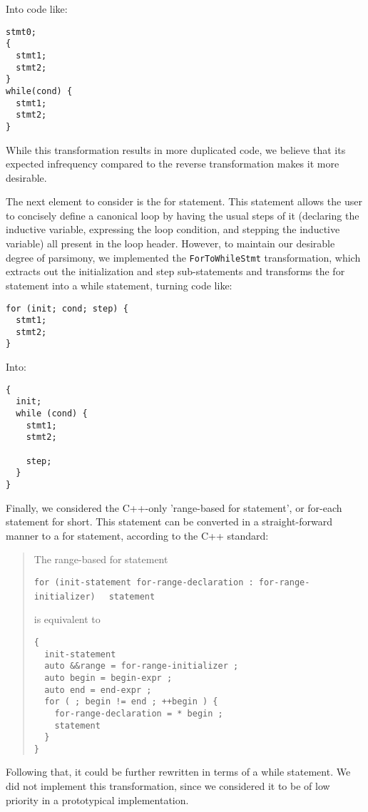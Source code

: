 Into code like:

\begin{lstlisting}
stmt0;
{
  stmt1;
  stmt2;
}
while(cond) {
  stmt1;
  stmt2;
}
\end{lstlisting}

While this transformation results in more duplicated code, we believe that its expected infrequency compared to the reverse transformation makes it more desirable.

The next element to consider is the for statement. This statement allows the user to concisely define a canonical loop by having the usual steps of it (declaring the inductive variable, expressing the loop condition, and stepping the inductive variable) all present in the loop header. However, to maintain our desirable degree of parsimony, we implemented the \verb|ForToWhileStmt| transformation, which extracts out the initialization and step sub-statements and transforms the for statement into a while statement, turning code like:

\begin{lstlisting}
for (init; cond; step) {
  stmt1;
  stmt2;
}
\end{lstlisting}

Into:

\begin{lstlisting}
{
  init;
  while (cond) {
    stmt1;
    stmt2;
    
    step;
  }
}
\end{lstlisting}

Finally, we considered the C++-only 'range-based for statement', or for-each statement for short. This statement can be converted in a straight-forward manner to a for statement, according to the C++ standard:

\begin{quote}
The range-based for statement

\verb|for (init-statement for-range-declaration : for-range-initializer)|
\verb|  statement|

is equivalent to
\begin{verbatim}
{
  init-statement
  auto &&range = for-range-initializer ;
  auto begin = begin-expr ;
  auto end = end-expr ;
  for ( ; begin != end ; ++begin ) {
    for-range-declaration = * begin ;
    statement
  }
}
\end{verbatim}
\end{quote}

Following that, it could be further rewritten in terms of a while statement. We did not implement this transformation, since we considered it to be of low priority in a prototypical implementation.

